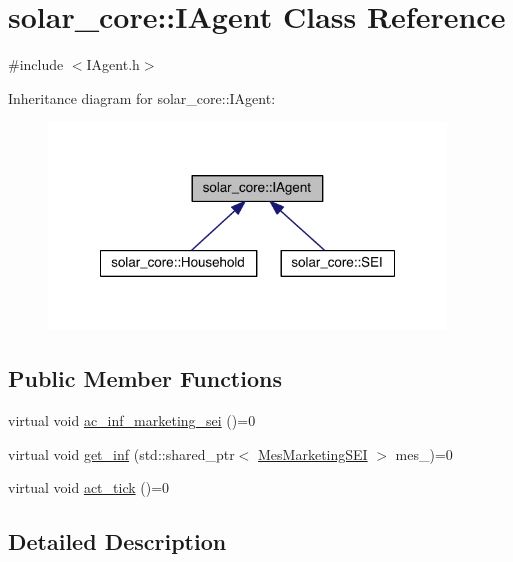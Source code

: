 \hypertarget{classsolar__core_1_1_i_agent}{}\section{solar\+\_\+core\+:\+:I\+Agent Class Reference}
\label{classsolar__core_1_1_i_agent}


{\ttfamily \#include $<$I\+Agent.\+h$>$}



Inheritance diagram for solar\+\_\+core\+:\+:I\+Agent\+:
\nopagebreak
\begin{figure}[H]
\begin{center}
\leavevmode
\includegraphics[width=299pt]{classsolar__core_1_1_i_agent__inherit__graph}
\end{center}
\end{figure}
\subsection*{Public Member Functions}
\begin{DoxyCompactItemize}
\item 
virtual void \hyperlink{classsolar__core_1_1_i_agent_a0333116b8ef74f3321ce7acff5d5332e}{ac\+\_\+inf\+\_\+marketing\+\_\+sei} ()=0
\item 
virtual void \hyperlink{classsolar__core_1_1_i_agent_aa9ebc762ed032f7084063199747decb6}{get\+\_\+inf} (std\+::shared\+\_\+ptr$<$ \hyperlink{classsolar__core_1_1_mes_marketing_s_e_i}{Mes\+Marketing\+S\+E\+I} $>$ mes\+\_\+)=0
\item 
virtual void \hyperlink{classsolar__core_1_1_i_agent_a6813e8e4f94ab2dc917a29c4d6609149}{act\+\_\+tick} ()=0
\end{DoxyCompactItemize}


\subsection{Detailed Description}


